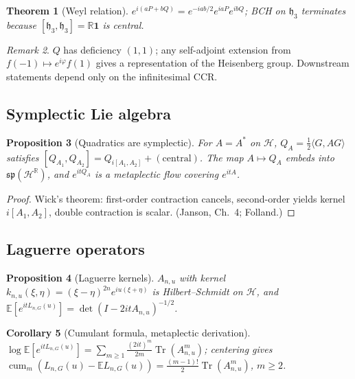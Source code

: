 \documentclass[11pt,reqno]{amsart}
\theoremstyle{plain}
\newtheorem{theorem}{Theorem}[section]
\newtheorem{proposition}[theorem]{Proposition}
\newtheorem{corollary}[theorem]{Corollary}
\theoremstyle{definition}
\theoremstyle{remark}
\newtheorem{remark}[theorem]{Remark}
\DeclareMathOperator{\cum}{cum}
\DeclareMathOperator{\Tr}{Tr}
\newcommand{\Hc}{\mathcal H}
\newcommand{\R}{\mathbb R}
\newcommand{\E}{\mathbb E}
\newcommand{\hh}{\mathfrak h}
\newcommand{\spalg}{\mathfrak{sp}}
\begin{document}
\begin{theorem}[Weyl relation]\label{thm:weyl}
\(e^{i(aP+bQ)}=e^{-iab/2}e^{iaP}e^{ibQ}\); BCH on \(\hh_3\) terminates because
\([\hh_3,\hh_3]=\R\mathbf 1\) is central.
\end{theorem}

\begin{remark}
\(Q\) has deficiency \((1,1)\); any self-adjoint extension from
\(f(-1)\mapsto e^{i\varphi}f(1)\) gives a representation of the Heisenberg
group. Downstream statements depend only on the infinitesimal CCR.
\end{remark}

\subsection{Symplectic Lie algebra}

\begin{proposition}[Quadratics are symplectic]\label{prop:spalg}
For \(A=A^*\) on \(\Hc\), \(Q_A=\tfrac12\langle G,AG\rangle\) satisfies
\([Q_{A_1},Q_{A_2}]=Q_{i[A_1,A_2]}+(\text{central})\). The map
\(A\mapsto Q_A\) embeds into \(\spalg(\Hc^\R)\), and \(e^{itQ_A}\) is a
metaplectic flow covering \(e^{itA}\).
\end{proposition}

\begin{proof}
Wick's theorem: first-order contraction cancels, second-order yields
kernel \(i[A_1,A_2]\), double contraction is scalar. (Janson,
Ch.~4; Folland.)
\end{proof}

\subsection{Laguerre operators}

\begin{proposition}[Laguerre kernels]\label{prop:laguerreinsp}
\(A_{n,u}\) with kernel \(k_{n,u}(\xi,\eta)=(\xi-\eta)^{2n}e^{iu(\xi+\eta)}\)
is Hilbert--Schmidt on \(\Hc\), and
\(\E[e^{itL_{n,G}(u)}]=\det(I-2itA_{n,u})^{-1/2}\).
\end{proposition}

\begin{corollary}[Cumulant formula, metaplectic derivation]\label{cor:metcumulants}
\(\log\E[e^{itL_{n,G}(u)}]=\sum_{m\ge1}\tfrac{(2it)^m}{2m}\Tr(A_{n,u}^m)\);
centering gives
\(\cum_m(L_{n,G}(u)-\E L_{n,G}(u))=\tfrac{(m-1)!}{2}\Tr(A_{n,u}^m)\), \(m\ge2\).
\end{corollary}
\end{document}
